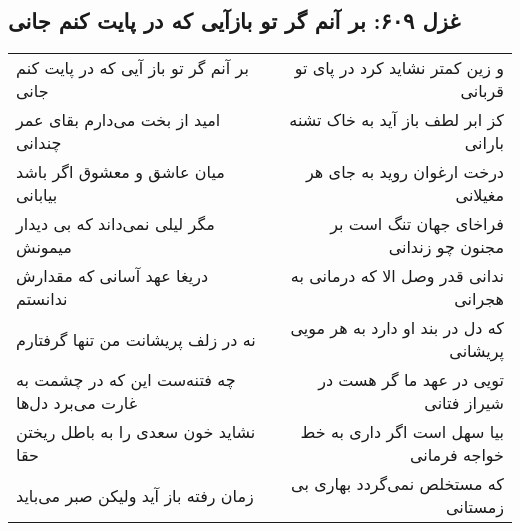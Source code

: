 \begin{center}
\section*{غزل ۶۰۹: بر آنم گر تو بازآیی که در پایت کنم جانی}
\label{sec:609}
\begin{longtable}{l p{0.5cm} r}
بر آنم گر تو باز آیی که در پایت کنم جانی
&&
و زین کمتر نشاید کرد در پای تو قربانی
\\
امید از بخت می‌دارم بقای عمر چندانی
&&
کز ابر لطف باز آید به خاک تشنه بارانی
\\
میان عاشق و معشوق اگر باشد بیابانی
&&
درخت ارغوان روید به جای هر مغیلانی
\\
مگر لیلی نمی‌داند که بی دیدار میمونش
&&
فراخای جهان تنگ است بر مجنون چو زندانی
\\
دریغا عهد آسانی که مقدارش ندانستم
&&
ندانی قدر وصل الا که درمانی به هجرانی
\\
نه در زلف پریشانت من تنها گرفتارم
&&
که دل در بند او دارد به هر مویی پریشانی
\\
چه فتنه‌ست این که در چشمت به غارت می‌برد دل‌ها
&&
تویی در عهد ما گر هست در شیراز فتانی
\\
نشاید خون سعدی را به باطل ریختن حقا
&&
بیا سهل است اگر داری به خط خواجه فرمانی
\\
زمان رفته باز آید ولیکن صبر می‌باید
&&
که مستخلص نمی‌گردد بهاری بی زمستانی
\\
\end{longtable}
\end{center}
